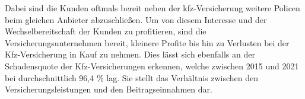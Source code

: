 Dabei sind die Kunden oftmals bereit neben der \ac{kfz}-Versicherung weitere Policen beim gleichen Anbieter abzuschließen. Um von diesem Interesse und der Wechselbereitschaft der Kunden zu profitieren, sind die Versicherungsunternehmen bereit, kleinere Profite bis hin zu Verlusten bei der Kfz-Versicherung in Kauf zu nehmen.\autocite[Vgl.][]{HARTUNG2019} Dies lässt sich ebenfalls an der Schadensquote der Kfz-Versicherungen erkennen, welche zwischen 2015 und 2021 bei durchschnittlich 96,4 \% lag. Sie stellt das Verhältnis zwischen den Versicherungsleistungen und den Beitragseinnahmen dar.\autocite[Vgl.][]{GDVKFZ}  



\newpage
